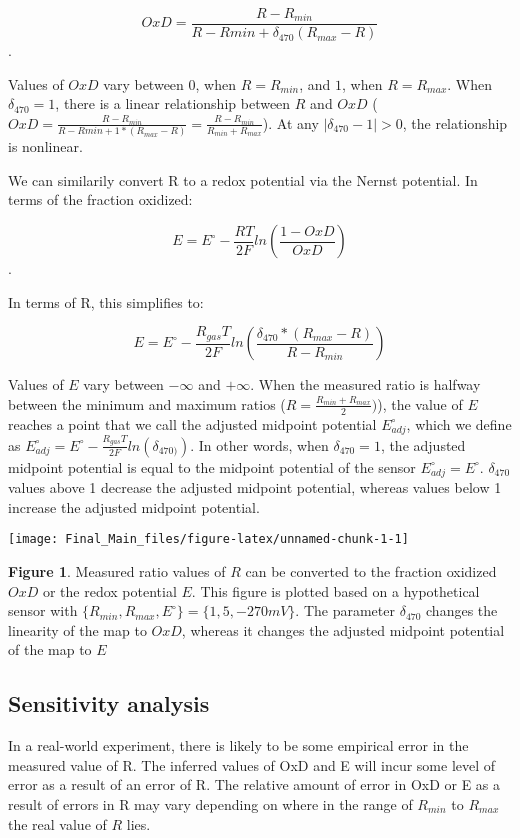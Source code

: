 \documentclass[]{article}
\begin{document}
\[ OxD = \frac{R-R_{min}}{R-R{min} + \delta_{470}(R_{max} - R)} \].

Values of \(OxD\) vary between \(0\), when \(R = R_{min}\), and \(1\),
when \(R = R_{max}\). When \(\delta_{470} = 1\), there is a linear
relationship between \(R\) and \(OxD\)
(\(OxD = \frac{R-R_{min}}{R-R{min} + 1 * (R_{max} - R)} = \frac{R-R_{min}}{R_{min} + R_{max}}\)).
At any \(|\delta_{470} - 1| > 0\), the relationship is nonlinear.

We can similarily convert R to a redox potential via the Nernst
potential. In terms of the fraction oxidized:

\[E = E^\circ - \frac{RT}{2F}ln(\frac{1-OxD}{OxD})\].

In terms of R, this simplifies to:

\[E = E^\circ - \frac{R_{gas}T}{2F}ln(\frac{\delta_{470}*(R_{max}-R)}{R-R_{min}})\]

Values of \(E\) vary between \(-\infty\) and \(+\infty\). When the
measured ratio is halfway between the minimum and maximum ratios
(\(R = \frac{R_{min} + R_{max}}{2})\)), the value of \(E\) reaches a
point that we call the adjusted midpoint potential \(E^\circ_{adj}\),
which we define as
\(E^\circ_{adj} = E^\circ - \frac{R_{gas}T}{2F}ln(\delta_{470)})\). In
other words, when \(\delta_{470} = 1\), the adjusted midpoint potential
is equal to the midpoint potential of the sensor
\(E^\circ_{adj} = E^\circ\). \(\delta_{470}\) values above 1 decrease
the adjusted midpoint potential, whereas values below 1 increase the
adjusted midpoint potential.

\begin{center}\texttt{[image: Final\_Main\_files/figure-latex/unnamed-chunk-1-1]} \end{center}

\textbf{Figure 1}. Measured ratio values of \(R\) can be converted to
the fraction oxidized \(OxD\) or the redox potential \(E\). This figure
is plotted based on a hypothetical sensor with
\(\{R_{min}, R_{max}, E^\circ\} = \{1, 5, -270 mV\}\). The parameter
\(\delta_{470}\) changes the linearity of the map to \(OxD\), whereas it
changes the adjusted midpoint potential of the map to \(E\)

\subsection{Sensitivity analysis}\label{sensitivity-analysis}

In a real-world experiment, there is likely to be some empirical error
in the measured value of R. The inferred values of OxD and E will incur
some level of error as a result of an error of R. The relative amount of
error in OxD or E as a result of errors in R may vary depending on where
in the range of \(R_{min}\) to \(R_{max}\) the real value of \(R\) lies.
\end{document}
